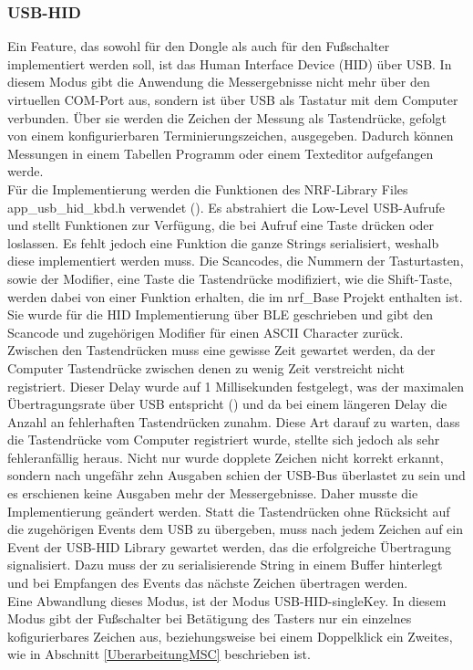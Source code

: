 \subsubsection{USB-HID}
Ein Feature, das sowohl für den Dongle als auch für den Fußschalter implementiert werden soll, ist das Human Interface Device (HID) über USB. In diesem Modus gibt die Anwendung die Messergebnisse nicht mehr über den virtuellen COM-Port aus, sondern ist über USB als Tastatur mit dem Computer verbunden. Über sie werden die Zeichen der Messung als Tastendrücke, gefolgt von einem konfigurierbaren Terminierungszeichen, ausgegeben. Dadurch können Messungen in einem Tabellen Programm oder einem Texteditor aufgefangen werde.\\
Für die Implementierung werden die Funktionen des NRF-Library Files app\_usb\_hid\_kbd.h verwendet (\cite{NRF_USB_HID_keyboard}). Es abstrahiert die Low-Level USB-Aufrufe und stellt Funktionen zur Verfügung, die bei Aufruf eine Taste drücken oder loslassen. Es fehlt jedoch eine Funktion die ganze Strings serialisiert, weshalb diese implementiert werden muss. Die Scancodes, die Nummern der Tasturtasten, sowie der Modifier, eine Taste die Tastendrücke modifiziert, wie die Shift-Taste, werden dabei von einer Funktion erhalten, die im nrf\_Base Projekt enthalten ist. Sie wurde für die \ac{HID} Implementierung über \ac{BLE} geschrieben und gibt den Scancode und zugehörigen Modifier für einen \ac{ASCII} Character zurück.\\
Zwischen den Tastendrücken muss eine gewisse Zeit gewartet werden, da der Computer Tastendrücke zwischen denen zu wenig Zeit verstreicht nicht registriert. Dieser Delay wurde auf 1 Millisekunden festgelegt, was der maximalen Übertragungsrate über \ac{USB} entspricht (\cite[17]{HID_Specification}) und da bei einem längeren Delay die Anzahl an fehlerhaften Tastendrücken zunahm. Diese Art darauf zu warten, dass die Tastendrücke vom Computer registriert wurde, stellte sich jedoch als sehr fehleranfällig heraus. Nicht nur wurde dopplete Zeichen nicht korrekt erkannt, sondern nach ungefähr zehn Ausgaben schien der \ac{USB}-Bus überlastet zu sein und es erschienen keine Ausgaben mehr der Messergebnisse. Daher musste die Implementierung geändert werden. Statt die Tastendrücken ohne Rücksicht auf die zugehörigen Events dem \ac{USB} zu übergeben, muss nach jedem Zeichen auf ein Event der \ac{USB}-\ac{HID} Library gewartet werden, das die erfolgreiche Übertragung signalisiert. Dazu muss der zu serialisierende String in einem Buffer hinterlegt und bei Empfangen des Events das nächste Zeichen übertragen werden.\\
Eine Abwandlung dieses Modus, ist der Modus \ac{USB}-\ac{HID}-singleKey. In diesem Modus gibt der Fußschalter bei Betätigung des Tasters nur ein einzelnes kofigurierbares Zeichen aus, beziehungsweise bei einem Doppelklick ein Zweites, wie in Abschnitt \ref{UberarbeitungMSC} beschrieben ist.

